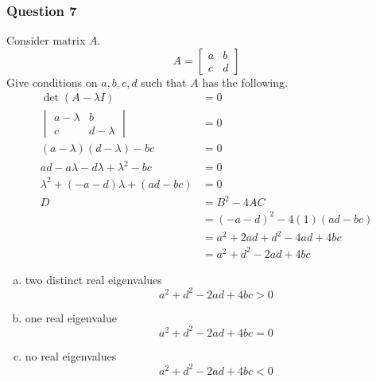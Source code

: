 \documentclass{math}
\begin{document}
\subsubsection*{Question 7}
Consider matrix \( A \).
\[ A = \begin{bmatrix}a & b \\ c & d\end{bmatrix} \]
Give conditions on \( a,b,c,d \) such that \( A \) has the following.
\begin{align*}
  \det(A-\lambda I) &= 0 \\
  \begin{vmatrix}
    a-\lambda & b \\
    c & d-\lambda
  \end{vmatrix} &= 0 \\
  (a-\lambda)(d-\lambda)-bc &= 0 \\
  ad-a\lambda-d\lambda+\lambda^2-bc &= 0 \\
  \lambda^2+(-a-d)\lambda+(ad-bc) &= 0 \\
  D &= B^2-4AC \\
  &= (-a-d)^2-4(1)(ad-bc) \\
  &= a^2+2ad+d^2-4ad+4bc \\
  &= a^2+d^2-2ad+4bc
\end{align*}
\begin{enumerate}[(a)]
  \item two distinct real eigenvalues
  \[ a^2+d^2-2ad+4bc > 0 \]
  \item one real eigenvalue
  \[ a^2+d^2-2ad+4bc = 0 \]
  \item no real eigenvalues
  \[ a^2+d^2-2ad+4bc < 0 \]
\end{enumerate}
\end{document}
